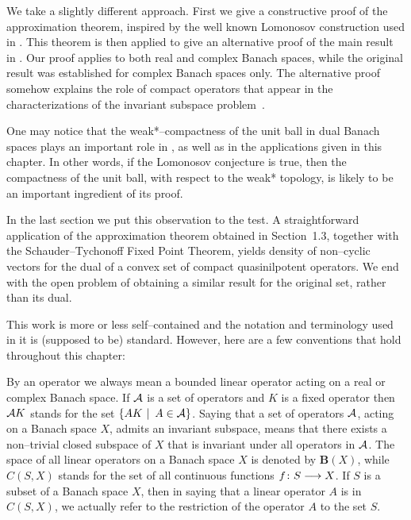 We take a slightly different approach. First we give a constructive proof of
the approximation theorem, inspired by the well known Lomonosov construction
used in \cite{Lom73,RR73}. This theorem is then applied to give an
alternative proof of the main result in \cite{AAB95}. Our proof applies to
both real and complex Banach spaces, while the original result was
established for complex Banach spaces only. The alternative proof somehow
explains the role of compact operators that appear in the characterizations
of the invariant subspace problem~\cite{AAB95}.

\medskip

One may notice that the weak*--compactness of the unit ball in dual Banach
spaces plays an important role in \cite{AAB95,dB59,dB93,Lom91}, as well as in
the applications given in this chapter. In other words, if the Lomonosov
conjecture is true, then the compactness of the unit ball, with respect to
the weak* topology, is likely to be an important ingredient of its proof.

\smallskip

In the last section we put this observation to the test. A straightforward
application of the approximation theorem obtained in Section~1.3, together
with the Schauder--Tychonoff Fixed Point Theorem, yields density of
non--cyclic vectors for the dual of a convex set of compact quasinilpotent
operators. We end with the open problem of obtaining a similar result for the
original set, rather than its dual.

\bigskip

This work is more or less self--contained and the notation and terminology
used in it is (supposed to be) standard. However, here are a few conventions
that hold throughout this chapter:

\bigskip

By an operator we always mean a bounded linear operator acting on a real or
complex Banach space. If ${\cal A}$ is a set of operators and $K$ is a fixed
operator then ${\cal A}{}K$ stands for the set $\left\{A{}K\,\,|\,\,\,A\in{\cal A}\right\}$.
Saying that a set of operators ${\cal A}$, acting on a Banach space $X$, admits an
invariant subspace, means that there exists a non--trivial closed subspace of
$X$ that is invariant under all operators in ${\cal A}$. The space of all linear
operators on a Banach space $X$ is denoted by $\mathbf{B}(X)$, while $C(S,X)$
stands for the set of all continuous functions $f\colon{}S\longrightarrow{}X$. If $S$ is
a subset of a Banach space $X$, then in saying that a linear operator $A$ is
in $C(S,X)$, we actually refer to the restriction of the operator $A$ to the
set $S$.

